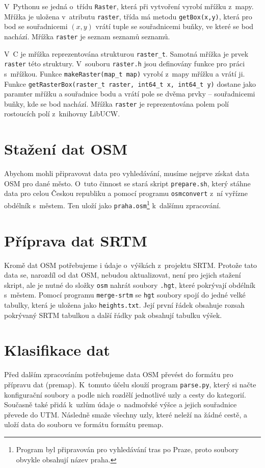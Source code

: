 V~Pythonu se jedná o~třídu \verb|Raster|, která při vytvoření vyrobí mřížku
z~mapy. Mřížka je uložena v~atributu \verb|raster|, třída má metodu
\verb|getBox(x,y)|, která pro bod se souřadnicemi $(x,y)$ vrátí tuple se
souřadnicemi buňky, ve které se bod nachází. Mřížka \verb|raster| je seznam
seznamů seznamů.

V~C je mřížka reprezentována strukturou \verb|raster_t|. Samotná mřížka je prvek
\verb|raster| této struktury. V~souboru \verb|raster.h| jsou definovány funkce
pro práci s~mřížkou. Funkce \verb|makeRaster(map_t map)| vyrobí z~mapy mřížku a
vrátí ji. Funkce \verb|getRasterBox(raster_t raster, int64_t x, int64_t y)|
dostane jako paramter mřížku a souřadnice bodu a vrátí pole se dvěma prvky --
souřadnicemi buňky, kde se bod nachází. Mřížka \verb|raster| je reprezentována
polem polí rostoucích polí z~knihovny LibUCW.

\medskip


\section{Stažení dat OSM}
Abychom mohli připravovat data pro vyhledávání, musíme nejprve získat data OSM
pro dané město. O~tuto činnost se stará skript \verb|prepare.sh|, který stáhne
data pro celou Českou republiku a pomocí programu \verb|osmconvert| z~ní vyřízne
obdélník s~městem. Ten uloží jako \verb|praha.osm|\footnote{Program byl
připravován pro vyhledávání tras po Praze, proto soubory obvykle obsahují název
praha.} k~dalšímu zpracování.

\section{Příprava dat SRTM}
Kromě dat OSM potřebujeme i údaje o~výškách z~projektu SRTM. Protože tato data
se, narozdíl od dat OSM, nebudou aktualizovat, není pro jejich stažení skript,
ale je nutné do složky \verb|osm| nahrát soubory \verb|.hgt|, které pokrývají
obdélník s~městem. Pomocí programu \verb|merge-srtm| se \verb|hgt| soubory spojí
do jedné velké tabulky, která je uložena jako \verb|heights.txt|. Její první
řádek obsahuje rozsah pokrývaný SRTM tabulkou a další řádky pak obsahují tabulku
výšek.

\section{Klasifikace dat}
Před dalším zpracováním potřebujeme data OSM převést do formátu pro přípravu dat (premap).
K~tomuto účelu slouží program \verb|parse.py|, který si načte konfigurační soubory
a podle nich rozdělí jednotlivé uzly a cesty do kategorií. Současně také přidá
k~uzlům údaje o~nadmořské výšce a jejich souřadnice převede do UTM. Následně smaže 
všechny uzly, které neleží na žádné cestě, a uloží data do souboru ve formátu 
formátu premap.

